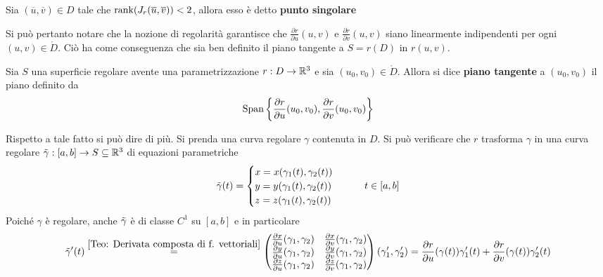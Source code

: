 \begin{definition}
    Sia $(\overline{u}, \overline{v}) \in D$ tale che $\operatorname{rank}(J_r(\overline{u}, \overline{v}))< 2$, allora esso è detto \textbf{punto singolare}
\end{definition}
Si può pertanto notare che la nozione di regolarità garantisce che $\tfrac{\partial r}{\partial u} (u,v)$ e $\tfrac{\partial r}{\partial v} (u,v)$ siano linearmente indipendenti per ogni $(u,v) \in \mathring{D}$. Ciò ha come conseguenza che sia ben definito il piano tangente a $S=r(D)$ in $r(u,v)$.
\begin{definition} \label{Def: Piano tangente ad una superficie}
    Sia $S$ una superficie regolare avente una parametrizzazione $r: D \to \mathbb{R}^3$ e sia $(u_0,v_0) \in \mathring{D}$. Allora si dice \textbf{piano tangente} a $(u_0, v_0)$ il piano definito da 
    \begin{equation*}
        \operatorname{Span}\left\{\frac{\partial r}{\partial u} (u_0,v_0), \frac{\partial r}{\partial v} (u_0,v_0)\right\}
    \end{equation*}
\end{definition}
Rispetto a tale fatto si può dire di più. Si prenda una curva regolare $\gamma$ contenuta in $D$. Si può verificare che $r$ trasforma $\gamma$ in una curva regolare $\Tilde{\gamma}:[a,b] \to S \subseteq \mathbb{R}^3$ di equazioni parametriche
\begin{equation*}
\Tilde{\gamma}(t)= \begin{cases} 
x= x(\gamma_1(t), \gamma_2(t))\\ 
y= y(\gamma_1(t), \gamma_2(t))\\
z= z(\gamma_1(t), \gamma_2(t))
\end{cases}
\qquad t \in [a,b]
\end{equation*}
Poiché $\gamma$ è regolare, anche $\Tilde{\gamma}$ è di classe $C^1$ su $[a,b]$ e in particolare
\begin{equation*}
    \Tilde{\gamma}'(t)\overset{\ref{Teo: Derivata composta di f. vettoriali}}{=}
        \begin{pmatrix}
            \frac{\partial x}{\partial u}(\gamma_1,\gamma_2) & \frac{\partial x}{\partial v}(\gamma_1,\gamma_2)\\
            \frac{\partial y}{\partial u}(\gamma_1,\gamma_2) & \frac{\partial y}{\partial v}(\gamma_1,\gamma_2)\\
            \frac{\partial z}{\partial u}(\gamma_1,\gamma_2) & \frac{\partial z}{\partial v}(\gamma_1,\gamma_2)
        \end{pmatrix}
        (\gamma_1', \gamma_2') = \frac{\partial r}{\partial u}(\gamma(t))\gamma_1'(t) + \frac{\partial r}{\partial v}(\gamma(t))\gamma_2'(t)
\end{equation*}
